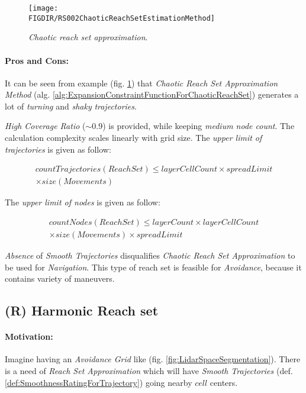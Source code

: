 \begin{figure}[H]
    \centering
    \texttt{[image: \\FIGDIR/RS002ChaoticReachSetEstimationMethod]} 
    \caption{\emph{Chaotic \emph{reach set} approximation}.}
    \label{fig:chaoticReachSetApproximation}
\end{figure}

\paragraph{Pros and Cons:} It can be seen from example (fig. \ref{fig:chaoticReachSetApproximation}) that \emph{Chaotic Reach Set Approximation Method} (alg. \ref{alg:ExpansionConstraintFunctionForChaoticReachSet}) generates a lot of \emph{turning} and \emph{shaky} \emph{trajectories}. 

\emph{High Coverage Ratio} ($\sim 0.9$) is provided, while keeping \emph{medium node count}. The calculation complexity scales linearly with grid size. The \emph{upper limit of trajectories} is given as follow:

\begin{multline}
    countTrajectories(ReachSet) \le layerCellCount \times spreadLimit\\ \times size(Movements)
\end{multline}

\noindent The \emph{upper limit of nodes} is given as follow:
    
\begin{multline}
    countNodes(ReachSet) \le layerCount \times  layerCellCount  \\
    \times size(Movements) \times spreadLimit  
\end{multline}

\noindent\emph{Absence} of \emph{Smooth Trajectories} disqualifies \emph{Chaotic Reach Set Approximation} to be used for \emph{Navigation}. This type of reach set is feasible for \emph{Avoidance}, because it contains variety of maneuvers.


\subsection{(R) Harmonic Reach set}\label{s:harmonicReachSet}

\paragraph{Motivation:} Imagine having an \emph{Avoidance Grid} like (fig. \ref{fig:LidarSpaceSegmentation}). There is a need of \emph{Reach Set Approximation} which will have \emph{Smooth Trajectories} (def. \ref{def:SmoothnessRatingForTrajectory}) going nearby $cell$ centers.

